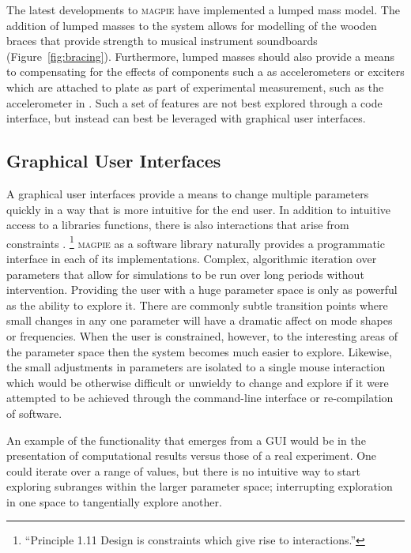 The latest developments to \textsc{magpie} have implemented a lumped mass model.
The addition of lumped masses to the system allows for modelling of the wooden
braces that provide strength to musical instrument soundboards
(Figure~\ref{fig:bracing}). Furthermore, lumped masses should also provide a
means to compensating for the effects of components such a as accelerometers or
exciters which are attached to plate as part of experimental measurement, such
as the accelerometer in \textcite{duran_experimentally_2023}. Such a set of
features are not best explored through a code interface, but instead can best be
leveraged with graphical user interfaces.

\subsection{Graphical User Interfaces}

A graphical user interfaces provide a means to change multiple parameters
quickly in a way that is more intuitive for the end user. In addition to
intuitive access to a libraries functions, there is also interactions that arise
from constraints \cite{wang_artful_2018}.%
\footnote{``Principle 1.11 Design is constraints which give rise to interactions.''}
\textsc{magpie} as a software library naturally provides a programmatic
interface in each of its implementations. Complex, algorithmic iteration over
parameters that allow for simulations to be run over long periods without
intervention. Providing the user with a huge parameter space is only as powerful
as the ability to explore it. There are commonly subtle transition points where
small changes in any one parameter will have a dramatic affect on mode shapes or
frequencies. When the user is constrained, however, to the interesting areas of
the parameter space then the system becomes much easier to explore. Likewise,
the small adjustments in parameters are isolated to a single mouse interaction
which would be otherwise difficult or unwieldy to change and explore if it were
attempted to be achieved through the command-line interface or re-compilation of
software.

An example of the functionality that emerges from a GUI would be in the
presentation of computational results versus those of a real experiment. One
could iterate over a range of values, but there is no intuitive way to start
exploring subranges within the larger parameter space; interrupting exploration
in one space to tangentially explore another.

